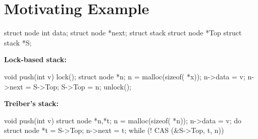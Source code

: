 
\section{Motivating Example}

\begin{figure*}[t]
\lstset{numbers=left, 
            numberstyle=\tiny\tt, 
            stepnumber=1, 
            firstnumber=1,
            numbersep=4pt}
{\footnotesize

\begin{minipage}{14cm}
\begin{minipage}{3.7cm}
\begin{program}
struct node {
	int data;
	struct node *next;
}
struct stack {
	struct node *Top
}
struct stack *S;
\end{program}
\end{minipage}
\begin{minipage}{4.7cm}
{\bf Lock-based stack:}
\begin{program}
void push(int v) {
	lock();
	struct node *n;
	n = malloc(sizeof( *x));
	n->data = v;
	n->next = S->Top;
	S->Top = n;
	unlock();
}
\end{program}
\end{minipage}
\begin{minipage}{6cm}
{\bf Treiber's stack:}
\begin{program}
void push(int v) {
	struct node *n,*t;
	n = malloc(sizeof( *n));
	n->data = v;
	do {
		struct node *t = S->Top;
		n->next = t;
	} while (! CAS (&S->Top, t, n))
}
\end{program}
\end{minipage}


\end{minipage}}
\end{figure*}
